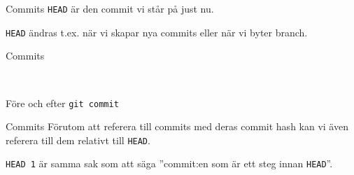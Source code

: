 \documentclass[11pt,xetex]{beamer}
\begin{document}
\begin{frame}{Commits}
  \Large
  \texttt{HEAD} är den commit vi står på just nu.

  \small
  \texttt{HEAD} ändras t.ex. när vi skapar nya commits eller när vi
  byter branch.
\end{frame}

\begin{frame}{Commits}
  \captionsetup{type=table}
  \begin{figure}[t!]
      \begin{subfigure}[b]{0.5\textwidth}
        \centering
      \end{subfigure}%
      ~
      \begin{subfigure}[b]{0.5\textwidth}
        \centering
      \end{subfigure}
  \end{figure}

  \center
  Före och efter \texttt{git commit}
\end{frame}

\begin{frame}{Commits}
  \Large
  Förutom att referera till commits med deras commit hash kan vi även referera
  till dem relativt till \texttt{HEAD}.

  \small
  \texttt{HEAD~1} är samma sak som att säga ''commit:en som är ett steg innan
  \texttt{HEAD}''.
\end{frame}
\end{document}
